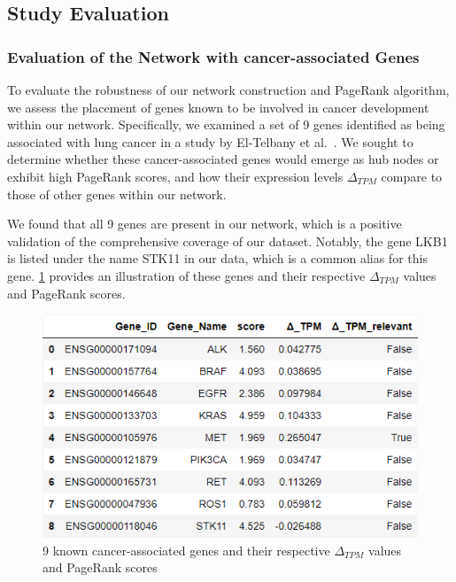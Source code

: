 \subsection{Study Evaluation} \label{subsec:evaluation}

\subsubsection*{Evaluation of the Network with cancer-associated Genes} \label{subsubsec:evaluation_known_genes}
To evaluate the robustness of our network construction and PageRank algorithm,
we assess the placement of genes known to be involved in cancer development within our network.
Specifically, we examined a set of 9 genes identified as being associated with lung cancer
in a study by El-Telbany et al.~\cite{ElTelbany2012LungCancerGenes}.
We sought to determine whether these cancer-associated genes would emerge as hub nodes or exhibit high PageRank scores,
and how their expression levels $\Delta_{TPM}$ compare to those of other genes within our network.

We found that all 9 genes are present in our network,
which is a positive validation of the comprehensive coverage of our dataset.
Notably, the gene LKB1 is listed under the name STK11 in our data, which is a common alias for this gene.
\cref{fig:05_01_df_known_genes} provides an illustration of these genes
and their respective $\Delta_{TPM}$ values and PageRank scores.

\begin{figure}[!h]
    \centering
    \includegraphics[height=\dfheightdouble]{figures/05_01_df_known_genes}
    \caption{9 known cancer-associated genes and their respective $\Delta_{TPM}$ values and PageRank scores}
    \label{fig:05_01_df_known_genes}
\end{figure}

